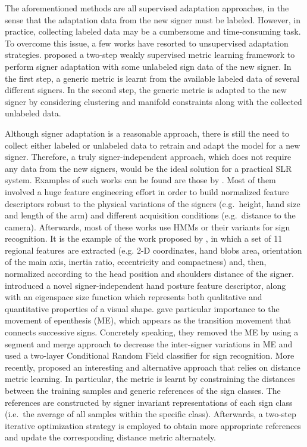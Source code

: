 The aforementioned methods are all supervised adaptation approaches, in the sense that the adaptation data from the new signer must be labeled. However, in practice, collecting labeled data may be a cumbersome and time-consuming task. To overcome this issue, a few works have resorted to unsupervised adaptation strategies. \citet{Yin2015} proposed a two-step weakly supervised metric learning framework to perform signer adaptation with some unlabeled sign data of the new signer. In the first step, a generic metric is learnt from the available labeled data of several different signers. In the second step, the generic metric is adapted to the new signer by considering clustering and manifold constraints along with the collected unlabeled data.

Although signer adaptation is a reasonable approach, there is still the need to collect either labeled or unlabeled data to retrain and adapt the model for a new signer. Therefore, a truly signer-independent approach, which does not require any data from the new signers, would be the ideal solution for a practical SLR system. Examples of such works can be found are those by \citet{Zieren2005, Shanableh2011, Agris2008b, Kong2014, Kelly2010, Dahmani2014, Yin2016}. Most of them involved a huge feature engineering effort in order to build normalized feature descriptors robust to the physical variations of the signers (e.g.\ height, hand size and length of the arm) and different acquisition conditions (e.g.\ distance to the camera). Afterwards, most of these works use HMMs or their variants for sign recognition. It is the example of the work proposed by \citet{Agris2008b}, in which a set of 11 regional features are extracted (e.g. 2-D coordinates, hand blobs area, orientation of the main axis, inertia ratio, eccentricity and compactness) and, then, normalized according to the head position and shoulders distance of the signer. \citet{Kelly2010} introduced a novel signer-independent hand posture feature descriptor, along with an eigenspace size function which represents both qualitative and quantitative properties of a visual shape. \citet{Kong2014} gave particular importance to the movement of epenthesis (ME), which appears as the transition movement that connects successive signs. Concretely speaking, they removed the ME by using a segment and merge approach to decrease the inter-signer variations in ME and used a two-layer Conditional Random Field classifier for sign recognition. More recently, \citet{Yin2016} proposed an interesting and alternative approach that relies on distance metric learning. In particular, the metric is learnt by constraining the distances between the training samples and generic references of the sign classes. The references are constructed by signer invariant representations of each sign class (i.e.\ the average of all samples within the specific class). Afterwards, a two-step iterative optimization strategy is employed to obtain more appropriate references and update the corresponding distance metric alternately.

